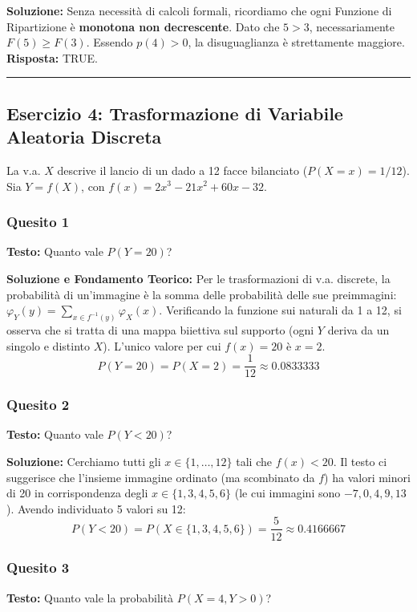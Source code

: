 \documentclass[12pt, a4paper]{article}
\begin{document}
\textbf{Soluzione:}
Senza necessità di calcoli formali, ricordiamo che ogni Funzione di Ripartizione è \textbf{monotona non decrescente}. Dato che $5 > 3$, necessariamente $F(5) \ge F(3)$. Essendo $p(4) > 0$, la disuguaglianza è strettamente maggiore.
\textbf{Risposta:} TRUE.

\vspace{0.5cm}\hrule\vspace{0.5cm}

\subsection*{Esercizio 4: Trasformazione di Variabile Aleatoria Discreta}
La v.a. $X$ descrive il lancio di un dado a 12 facce bilanciato ($P(X=x) = 1/12$). 
Sia $Y = f(X)$, con $f(x) = 2x^3 - 21x^2 + 60x - 32$.

\subsubsection*{Quesito 1}
\textbf{Testo:} Quanto vale $P(Y=20)$?

\textbf{Soluzione e Fondamento Teorico:} 
Per le trasformazioni di v.a. discrete, la probabilità di un'immagine è la somma delle probabilità delle sue preimmagini: $\varphi_Y(y) = \sum_{x \in f^{-1}(y)} \varphi_X(x)$.
Verificando la funzione sui naturali da 1 a 12, si osserva che si tratta di una mappa biiettiva sul supporto (ogni $Y$ deriva da un singolo e distinto $X$). L'unico valore per cui $f(x) = 20$ è $x = 2$.
$$ P(Y=20) = P(X=2) = \frac{1}{12} \approx 0.0833333 $$

\subsubsection*{Quesito 2}
\textbf{Testo:} Quanto vale $P(Y < 20)$?

\textbf{Soluzione:}
Cerchiamo tutti gli $x \in \{1,\dots,12\}$ tali che $f(x) < 20$. 
Il testo ci suggerisce che l'insieme immagine ordinato (ma scombinato da $f$) ha valori minori di 20 in corrispondenza degli $x \in \{1, 3, 4, 5, 6\}$ (le cui immagini sono $-7, 0, 4, 9, 13$).
Avendo individuato 5 valori su 12:
$$ P(Y < 20) = P(X \in \{1, 3, 4, 5, 6\}) = \frac{5}{12} \approx 0.4166667 $$

\subsubsection*{Quesito 3}
\textbf{Testo:} Quanto vale la probabilità $P(X=4, Y>0)$?
\end{document}
